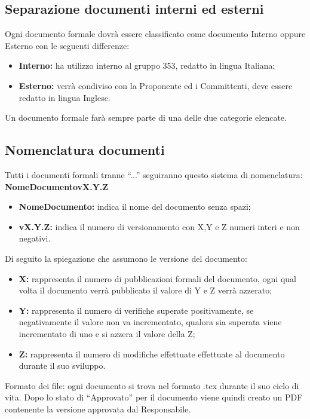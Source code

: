 \documentclass[NormeDiProgetto.tex]{subfiles}
\begin{document}
	\subsection{Separazione documenti interni ed esterni}
	Ogni documento formale dovrà essere classificato come documento Interno
	oppure Esterno con le seguenti differenze:
	\begin{itemize}
		\item \textbf{Interno:} ha utilizzo interno al gruppo 353, redatto in lingua Italiana;
		\item \textbf{Esterno:} verrà condiviso con la Proponente ed i Committenti, deve essere redatto in lingua Inglese.
	\end{itemize}
	Un documento formale farà sempre parte di una delle due categorie elencate.
	
	\subsection{Nomenclatura documenti}
	Tutti i documenti formali tranne “...” seguiranno questo sistema di nomenclatura: \textbf{NomeDocumento\textunderscore vX.Y.Z}

	\begin{itemize}
		\item\textbf{ NomeDocumento:} indica il nome del documento senza spazi;
		\item \textbf{vX.Y.Z:} indica il numero di versionamento con X,Y e Z numeri interi e non negativi.	
	\end{itemize}
	Di seguito la spiegazione che assumono le versione del documento:
	\begin{itemize}
		\item \textbf{X:} rappresenta il numero di pubblicazioni formali del documento, ogni qual volta il documento verrà pubblicato il valore di Y e Z verrà azzerato;
		\item \textbf{Y:} rappresenta il numero di verifiche superate positivamente, se negativamente il valore non va incrementato, qualora sia superata viene incrementato di uno e si azzera il valore della Z;
		\item \textbf{Z:} rappresenta il numero di modifiche effettuate effettuate al documento durante il suo sviluppo.	
	\end{itemize}
	Formato dei file: ogni documento si trova nel formato .tex durante il suo ciclo di vita.
	Dopo lo stato di “Approvato” per il documento viene quindi creato un PDF contenente la versione approvata dal Responsabile.
	
\end{document}
